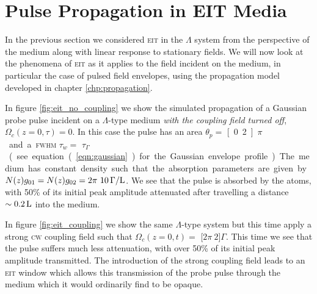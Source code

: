 \section{Pulse Propagation in EIT Media}
  \label{sec:polaritons_propagation}

    In the previous section we considered \textsc{eit} in the $\Lambda$ system
    from the perspective of the medium along with linear response to stationary
    fields. We will now look at the phenomena of \textsc{eit} as it applies to
    the field incident on the medium, in particular the case of pulsed field
    envelopes, using the propagation model developed in chapter
    \ref{chp:propagation}.

    In figure \ref{fig:eit_no_coupling} we show the simulated propagation of a
    Gaussian probe pulse incident on a $\Lambda$-type medium \textit{with the
    coupling field turned off}, \ie $\Omega_c(z=0, \tau) = 0$. In this case the
    pulse has an area $\theta_p = $ \unit[0.2]{$\pi$} and a \textsc{fwhm}
    $\tau_w = $ \unit[1]{$\tau_\Gamma$} (see equation (\ref{eqn:gaussian}) for
    the Gaussian envelope profile). The medium has constant density such that
    the absorption parameters are given by  $N(z) g_{01} = N(z) g_{02} =
    \unit[2\pi~10]{\Gamma/L}$. We see that the pulse is absorbed by the atoms,
    with 50\% of its initial peak amplitude attenuated after travelling a
    distance $\unit[\sim0.2]{L}$ into the medium.

    In figure \ref{fig:eit_coupling} we show the same $\Lambda$-type system but
    this time apply a strong \textsc{cw} coupling field such that $\Omega_c(z =
    0, t) = $ \unit[$2\pi~2$]{$\Gamma$}. This time we see that the pulse suffers
    much less attenuation, with over 50\% of its initial peak amplitude
    transmitted. The introduction of the strong coupling field leads to an
    \textsc{eit} window which allows this transmission of the probe pulse
    through the medium which it would ordinarily find to be
    opaque.\cite{Fleischhauer2005}

